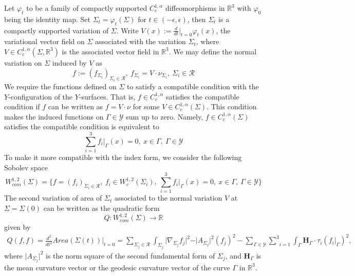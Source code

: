\documentclass[10pt,a4paper]{amsart}
\theoremstyle{theorem}
\theoremstyle{definition}
\numberwithin{equation}{section}
\providecommand{\bold}{\mathbf}
\begin{document}
Let $\varphi_t$ to be a family of compactly supported $C_c^{1,\alpha}$ diffeomorphisms in $\mathbb{R}^3$ with $\varphi_0$ being the identity map. Set $\Sigma_t=\varphi_t(\Sigma)$ for $t\in (-\epsilon,\epsilon)$, then $\Sigma_t$ is a compactly supported variation of $\Sigma$. Write $V(x):=\frac{d}{dt}\vert_{t=0}\varphi_t(x)$, the variational vector field on $\Sigma$ associated with the variation $\Sigma_t$, where $V\in C_c^{1,\alpha}(\Sigma,\mathbb{R}^3)$ is the associated vector field in $\mathbb{R}^3$. We may define the normal variation on $\Sigma$ induced by $V$ as 
$$
f:=(f_{\Sigma_i})_{\Sigma_i\in \mathcal{R}},\ f_{\Sigma_i}=V\cdot \nu_{\Sigma_i},\ \Sigma_i \in \mathcal{R}
$$
We require the functions defined on $\Sigma$ to satisfy a compatible condition with the $Y$-configuration of the $Y$-surfaces. That is, $f\in C_c^{1,\alpha}$ satisfies the compatible condition if $f$ can be written as $f=V\cdot \nu$ for some $V\in C_c^{1,\alpha}(\Sigma)$. This condition makes the induced functions on $\Gamma \in \mathcal{Y}$ sum up to zero. Namely, $f\in C_c^{1,\alpha}(\Sigma)$ satisfies the compatible condition is equivalent to 
$$
\underset{i=1}{\overset{3}{\sum}}f_i\vert_{\Gamma}(x)=0,\ x\in \Gamma,\  \Gamma\in \mathcal{Y}
$$
To make it more compatible with the index form, we consider the following Sobolev space
$$
W_{com}^{1,2}(\Sigma)=\{ f=(f_{i})_{\Sigma_i\in \mathcal{R}},\ f_i\in W_c^{1,2}(\Sigma_i),\ \underset{i=1}{\overset{3}{\sum}}f_i\vert_{\Gamma}(x)=0,\ x\in \Gamma,\  \Gamma\in \mathcal{Y}\} 
$$
The second variation of area of $\Sigma_t$ associated to the normal variation $V$ at $\Sigma =\Sigma(0)$ can be  written as the quadratic form
\begin{equation}
    \nonumber
    Q : W_{com}^{1,2} (\Sigma) \rightarrow \mathbb{R} 
\end{equation}
given by 
\begin{equation} \label{eqn: 2nd variation fromula}
\begin{split}
   Q(f , f) = \frac{d^2}{dt^2} Area (\Sigma (t))\vert_{t=0} =  \underset{\Sigma_j\in \mathcal{R}}{\overset{}{\sum}}  \int_{\Sigma_j} \vert \nabla_{\Sigma_j} f_j \vert^2 - \vert A_{\Sigma_j} \vert^2 (f_j )^2  
     - \underset{\Gamma\in \mathcal{Y}}{\overset{}{\sum}}\underset{i=1}{\overset{3}{\sum}} \int_{\Gamma }    \bold{H}_{\Gamma} \cdot \tau_i (f_i \vert_{\Gamma} )^2 ,
   \end{split}
\end{equation}
where $\vert A_{\Sigma_j} \vert^2$ is the norm square of the second fundamental form of $\Sigma_j$, and $\bold{H}_{\Gamma}$ is the mean curvature vector or the geodesic curvature vector of the curve $\Gamma$ in $\mathbb{R}^3$. 
\medskip
\end{document}
